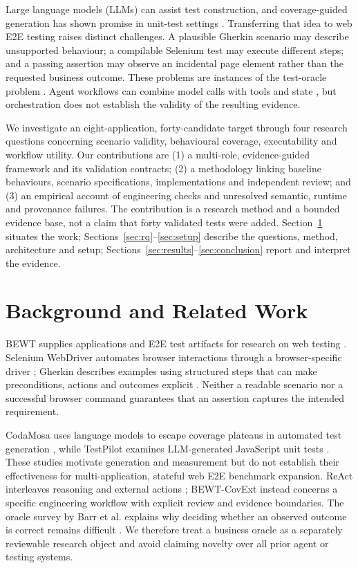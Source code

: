 \documentclass[pdflatex,sn-mathphys-num]{sn-jnl}
\begin{document}
Large language models (LLMs) can assist test construction, and coverage-guided generation has shown promise in unit-test settings \cite{lemieux2023codamosa,schafer2024testpilot}. Transferring that idea to web E2E testing raises distinct challenges. A plausible Gherkin scenario may describe unsupported behaviour; a compilable Selenium test may execute different steps; and a passing assertion may observe an incidental page element rather than the requested business outcome. These problems are instances of the test-oracle problem \cite{barr2015oracle}. Agent workflows can combine model calls with tools and state \cite{yao2023react,langgraphoverview}, but orchestration does not establish the validity of the resulting evidence.

We investigate an eight-application, forty-candidate target through four research questions concerning scenario validity, behavioural coverage, executability and workflow utility. Our contributions are (1) a multi-role, evidence-guided framework and its validation contracts; (2) a methodology linking baseline behaviours, scenario specifications, implementations and independent review; and (3) an empirical account of engineering checks and unresolved semantic, runtime and provenance failures. The contribution is a research method and a bounded evidence base, not a claim that forty validated tests were added. Section~\ref{sec:background} situates the work; Sections~\ref{sec:rq}--\ref{sec:setup} describe the questions, method, architecture and setup; Sections~\ref{sec:results}--\ref{sec:conclusion} report and interpret the evidence.

\section{Background and Related Work}\label{sec:background}
BEWT supplies applications and E2E test artifacts for research on web testing \cite{olianas2026bewt}. Selenium WebDriver automates browser interactions through a browser-specific driver \cite{seleniumwebdriver}; Gherkin describes examples using structured steps that can make preconditions, actions and outcomes explicit \cite{cucumbergherkin}. Neither a readable scenario nor a successful browser command guarantees that an assertion captures the intended requirement.

CodaMosa uses language models to escape coverage plateaus in automated test generation \cite{lemieux2023codamosa}, while TestPilot examines LLM-generated JavaScript unit tests \cite{schafer2024testpilot}. These studies motivate generation and measurement but do not establish their effectiveness for multi-application, stateful web E2E benchmark expansion. ReAct interleaves reasoning and external actions \cite{yao2023react}; BEWT-CovExt instead concerns a specific engineering workflow with explicit review and evidence boundaries. The oracle survey by Barr et al. explains why deciding whether an observed outcome is correct remains difficult \cite{barr2015oracle}. We therefore treat a business oracle as a separately reviewable research object and avoid claiming novelty over all prior agent or testing systems.
\end{document}
